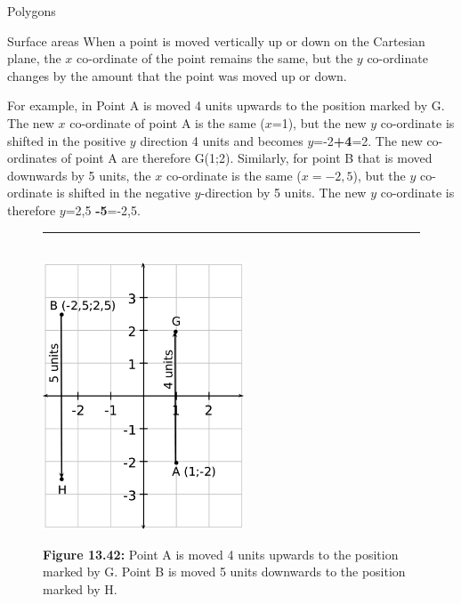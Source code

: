 \begin{exercises}{Polygons}
\begin{exercises}{Surface areas }
        \label{m39358*id70438}When a point is moved vertically up or down on the Cartesian plane, the $x$ co-ordinate of the point remains the same, but the $y$ co-ordinate changes by the amount that the point was moved up or down.\par 
        \label{m39358*id70461}For example, in  Point A is moved 4 units upwards to the position marked by G. The new $x$ co-ordinate of point A is the same ($x$=1), but the new $y$ co-ordinate is shifted in the positive $y$ direction 4 units and becomes $y$=-2\textbf{+4}=2. The new co-ordinates of point A are therefore G(1;2). Similarly, for point B that is moved downwards by 5 units, the $x$ co-ordinate is the same ($x=-2,5$), but the $y$ co-ordinate is shifted in the negative $y$-direction by 5 units. The new $y$ co-ordinate is therefore $y$=2,5 \textbf{-5}=-2,5.\par 
        
    \setcounter{subfigure}{0}


	\begin{figure}[H] %
    \begin{center}
    \rule[.1in]{\figurerulewidth}{.005in} \\
        \label{m39358*uid70!!!underscore!!!media}\label{m39358*uid70!!!underscore!!!printimage}\includegraphics[height=300px]{col11306.imgs/m39358_MG10C14_023.png} %
        
      \vspace{2pt}
    \vspace{\rubberspace}\par \begin{cnxcaption}
	  \small \textbf{Figure 13.42: }Point A is moved 4 units upwards to the position marked by G. Point B is moved 5 units downwards to the position marked by H.
	\end{cnxcaption}
      

\end{center}
\end{figure}
\end{exercises}
\end{exercises}
